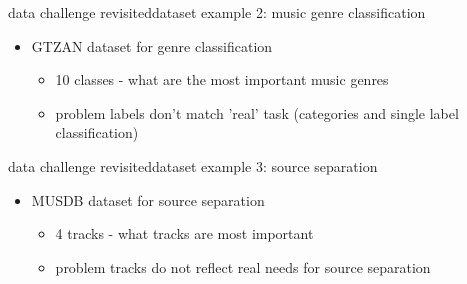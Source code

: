 \begin{frame}{data challenge revisited}{dataset example 2: music genre classification}
		\begin{itemize}
			\item	GTZAN dataset for genre classification
					\begin{itemize}
							\item 10 classes - what are the most important music genres
							\item	problem labels don't match 'real' task (categories and single label classification)
					\end{itemize}
		\end{itemize}
\end{frame}

\begin{frame}{data challenge revisited}{dataset example 3: source separation}
		\begin{itemize}
			\item	MUSDB dataset for source separation
					\begin{itemize}
							\item 4 tracks - what tracks are most important
							\item	problem tracks do not reflect real needs for source separation
					\end{itemize}
		\end{itemize}
\end{frame}

